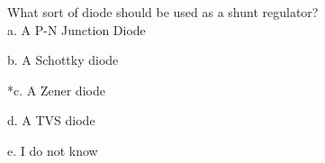 
What sort of diode should be used as a shunt regulator? \\

a. A P-N Junction Diode

b. A Schottky diode

*c. A Zener diode

d. A TVS diode

e. I do not know \\
